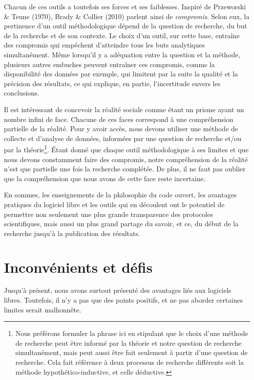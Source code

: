 \documentclass[
  letterpaper,
  DIV=11,
  numbers=noendperiod]{scrreprt}
\begin{document}
Chacun de ces outils a toutefois ses forces et ses faiblesses. Inspiré
de Przeworski \& Teune (1970), Brady \& Collier (2010) parlent ainsi de
\emph{compromis}. Selon eux, la pertinence d'un outil méthodologique
dépend de la question de recherche, du but de la recherche et de son
contexte. Le choix d'un outil, sur cette base, entraîne des compromis
qui empêchent d'atteindre tous les buts analytiques simultanément. Même
lorsqu'il y a adéquation entre la question et la méthode, plusieurs
autres embuches peuvent entraîner ces compromis, comme la disponibilité
des données par exemple, qui limitent par la suite la qualité et la
précision des résultats, ce qui explique, en partie, l'incertitude
envers les conclusions.

Il est intéressant de concevoir la réalité sociale comme étant un prisme
ayant un nombre infini de face. Chacune de ces faces correspond à une
compréhension partielle de la réalité. Pour y avoir accès, nous devons
utiliser une méthode de collecte et d'analyse de données, informées par
une question de recherche et/ou par la théorie\footnote{Nous préférons
  formuler la phrase ici en stipulant que le choix d'une méthode de
  recherche peut être informé par la théorie et notre question de
  recherche simultanément, mais peut aussi être fait seulement à partir
  d'une question de recherche. Cela fait référence à deux processus de
  recherche différents soit la méthode hypothético-inductive, et celle
  déductive.}. Étant donné que chaque outil méthodologique à ses limites
et que nous devons constamment faire des compromis, notre compréhension
de la réalité n'est que partielle une fois la recherche complétée. De
plus, il ne faut pas oublier que la compréhension que nous avons de
cette face reste incertaine.

En sommes, les enseignements de la philosophie du code ouvert, les
avantages pratiques du logiciel libre et les outils qui en découlent ont
le potentiel de permettre non seulement une plus grande transparence des
protocoles scientifiques, mais aussi un plus grand partage du savoir, et
ce, du début de la recherche jusqu'à la publication des résultats.

\section{Inconvénients et défis}\label{inconvuxe9nients-et-duxe9fis}

Jusqu'à présent, nous avons surtout présenté des avantages liés aux
logiciels libres. Toutefois, il n'y a pas que des points positifs, et ne
pas aborder certaines limites serait malhonnête.
\end{document}
